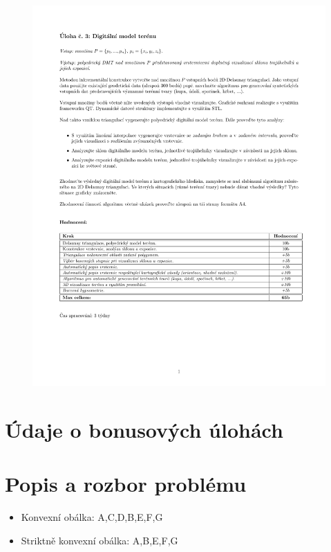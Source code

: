 \documentclass[a4paper, 12pt]{article}
\begin{document}
\begin{figure}[h!]
	\includegraphics[clip, trim=0cm 5cm 0cm 3cm, width=1.0\textwidth]{zadani.pdf}
\end{figure}


\section{Údaje o bonusových úlohách}




\clearpage

\section{Popis a rozbor problému}


\begin{itemize}
\item Konvexní obálka: A,C,D,B,E,F,G
\item Striktně konvexní obálka: A,B,E,F,G
\end{itemize}
\end{document}
